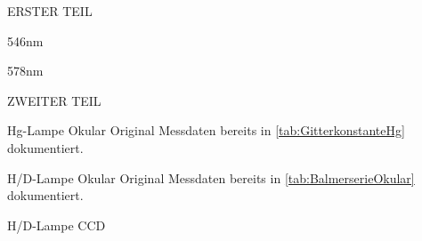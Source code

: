 \begin{appendix}
\begin{chapter}{ERSTER TEIL}
\begin{section}{546nm}
      
      
      \end{section}
      
     
     
      \begin{section}{578nm}
        \label{Anhang:chp:ERSTERTEIL:sec:578}
      
      
      
      \end{section}
     
    \end{chapter}
    
    
    
    \begin{chapter}{ZWEITER TEIL}
      \label{Anhang:chp:ZWEITERTEIL}
     
     
     
      \begin{section}{Hg-Lampe Okular}
        \label{Anhang:chp:ZWEITERTEIL:sec:HgLampeOkular}
        Original Messdaten bereits in \cref{tab:GitterkonstanteHg}
        dokumentiert.
        
      \end{section}
      
     
     
      \begin{section}{H/D-Lampe Okular}
        \label{Anhang:chp:ZWEITERTEIL:sec:HDLampeOkular}
        Original Messdaten bereits in \cref{tab:BalmerserieOkular} 
        dokumentiert.
      
      \end{section}
      
     
     
      \begin{section}{H/D-Lampe CCD}
        \label{Anhang:chp:ZWEITERTEIL:sec:HDLampeCCD}
        

\end{section}
\end{chapter}
\end{appendix}
